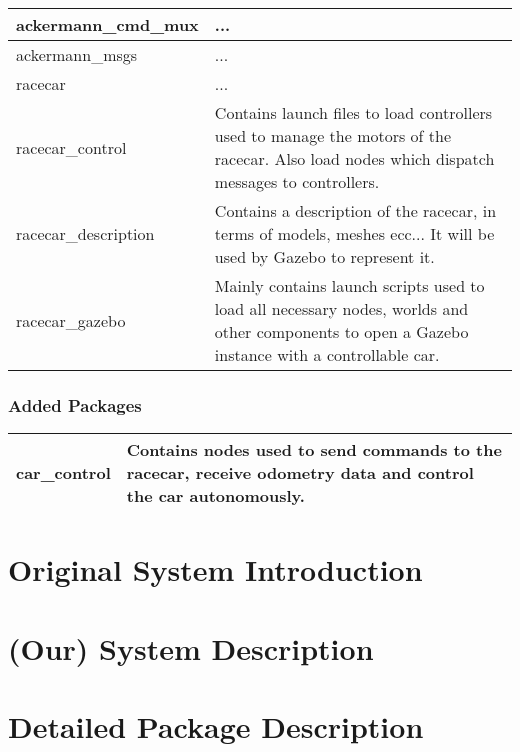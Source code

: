 \documentclass[12pt, letterpaper, oneside]{report}
\begin{document}
\begin{center}
	\begin{tabularx}{\textwidth}{
			| >{\raggedright\arraybackslash}X
			| >{\raggedright\arraybackslash}X |
		}
		\hline
		ackermann\_cmd\_mux & ... \\
		\hline
		ackermann\_msgs & ... \\
		\hline
		racecar & ... \\
		\hline
		racecar\_control & Contains launch files to load controllers used to manage the motors of the racecar. Also load nodes which dispatch messages to controllers. \\
		\hline
		racecar\_description & Contains a description of the racecar, in terms of models, meshes ecc... It will be used by Gazebo to represent it. \\
		\hline
		racecar\_gazebo & Mainly contains launch scripts used to load all necessary nodes, worlds and other components to open a Gazebo instance with a controllable car. \\
		\hline
	\end{tabularx}
\end{center}

\subsection{Added Packages}

\begin{center}
	\begin{tabularx}{\textwidth}{
			| >{\raggedright\arraybackslash}X
			| >{\raggedright\arraybackslash}X |
		}
		\hline
		car\_control & Contains nodes used to send commands to the racecar, receive odometry data and control the car autonomously. \\
		\hline
	\end{tabularx}
\end{center}

\chapter{Original System Introduction}
\chapter{(Our) System Description}
\chapter{Detailed Package Description}
\end{document}
